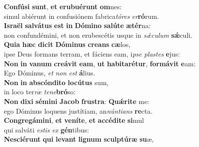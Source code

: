 \evenverse \textbf{Con}\textbf{fú}\textbf{si} \textbf{sunt}, \textbf{et} \textbf{e}\textbf{ru}\textbf{bu}\textbf{é}\textbf{runt} \textbf{om}nes:~\*\\
\evenverse simul abiérunt in confusiónem fabrica\textit{tó}\textit{res} \textit{er}\textbf{ró}rum.\\
\oddverse \textbf{Is}\textbf{ra}\textbf{ël} \textbf{sal}\textbf{vá}\textbf{tus} \textbf{est} \textbf{in} \textbf{Dó}\textbf{mi}\textbf{no} \textbf{sa}\textbf{lú}\textbf{te} \textbf{æ}\textbf{tér}na:~\*\\
\oddverse non confundémini, et non erubescétis usque in \textit{sǽ}\textit{cu}\textit{lum} \textbf{sǽ}culi.\\
\evenverse \textbf{Qui}\textbf{a} \textbf{hæc} \textbf{di}\textbf{cit} \textbf{Dó}\textbf{mi}\textbf{nus} \textbf{cre}\textbf{ans} \textbf{cæ}los,~\*\\
\evenverse ipse Deus formans terram, et fáciens eam, i\textit{pse} \textit{pla}\textit{stes} \textbf{e}jus:\\
\oddverse \textbf{Non} \textbf{in} \textbf{va}\textbf{num} \textbf{cre}\textbf{á}\textbf{vit} \textbf{e}\textbf{am}, \textbf{ut} \textbf{ha}\textbf{bi}\textbf{ta}\textbf{ré}\textbf{tur}, \textbf{for}\textbf{má}\textbf{vit} \textbf{e}am:~\*\\
\oddverse Ego Dóminus, \textit{et} \textit{non} \textit{est} \textbf{á}lius.\\
\evenverse \textbf{Non} \textbf{in} \textbf{ab}\textbf{scón}\textbf{di}\textbf{to} \textbf{lo}\textbf{cú}\textbf{tus} sum,~\*\\
\evenverse in loco ter\textit{ræ} \textit{te}\textit{ne}\textbf{bró}so:\\
\oddverse \textbf{Non} \textbf{di}\textbf{xi} \textbf{sé}\textbf{mi}\textbf{ni} \textbf{Ja}\textbf{cob} \textbf{fru}\textbf{stra}: \textbf{Quǽ}\textbf{ri}\textbf{te} me:~\*\\
\oddverse ego Dóminus loquens justítiam, an\textit{nún}\textit{ti}\textit{ans} \textbf{re}cta.\\
\evenverse \textbf{Con}\textbf{gre}\textbf{gá}\textbf{mi}\textbf{ni}, \textbf{et} \textbf{ve}\textbf{ní}\textbf{te}, \textbf{et} \textbf{ac}\textbf{cé}\textbf{di}\textbf{te} \textbf{si}mul~\*\\
\evenverse qui salváti \textit{e}\textit{stis} \textit{ex} \textbf{gén}tibus:\\
\oddverse \textbf{Ne}\textbf{sci}\textbf{é}\textbf{runt} \textbf{qui} \textbf{le}\textbf{vant} \textbf{li}\textbf{gnum} \textbf{scul}\textbf{ptú}\textbf{ræ} \textbf{su}æ,~\*\\
